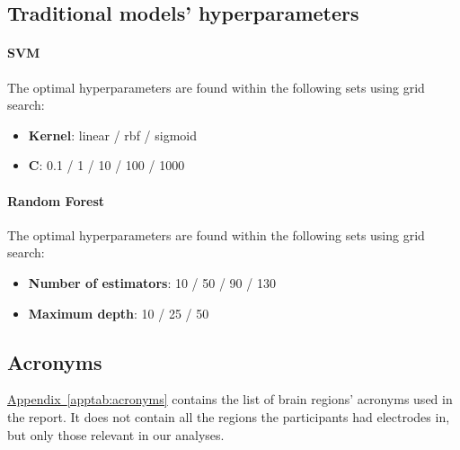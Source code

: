 \documentclass[10pt,conference,compsocconf]{IEEEtran}
\newcommand{\aref}[1]{\hyperref[#1]{Appendix~\ref*{#1}}}
\begin{document}
\subsection{Traditional models' hyperparameters}
\label{subsec:mlhyperparams}
\paragraph{SVM}
The optimal hyperparameters are found within the following sets using grid search:
\begin{itemize}
    \item \textbf{Kernel}: linear / rbf / sigmoid
    \item \(\mathbf{C}\): 0.1 / 1 / 10 / 100 / 1000
\end{itemize}
\paragraph{Random Forest}
The optimal hyperparameters are found within the following sets using grid search:
\begin{itemize}
    \item \textbf{Number of estimators}: 10 / 50 / 90 / 130
    \item \textbf{Maximum depth}: 10 / 25 / 50
\end{itemize}

\subsection{Acronyms}
\label{subsec:acronyms}
\aref{apptab:acronyms} contains the list of brain regions' acronyms used in the report. It does not contain all the regions the participants had electrodes in, but only those relevant in our analyses.
\end{document}
